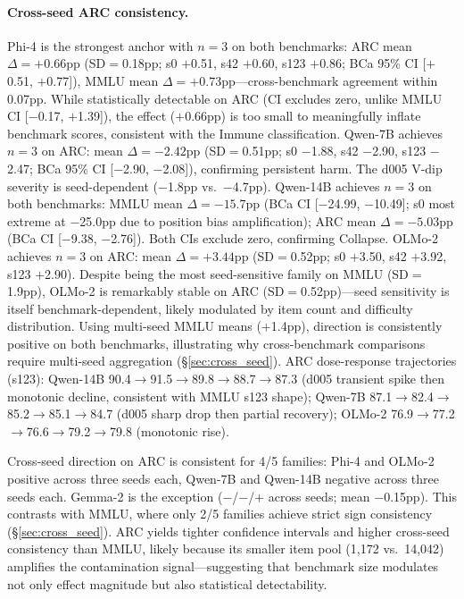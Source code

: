 \paragraph{Cross-seed ARC consistency.}
Phi-4 is the strongest anchor with $n\!=\!3$ on both benchmarks: ARC mean $\Delta = +0.66$pp (SD$=$0.18pp; s0 $+$0.51, s42 $+$0.60, s123 $+$0.86; BCa 95\% CI [$+$0.51, $+$0.77]), MMLU mean $\Delta = +0.73$pp---cross-benchmark agreement within 0.07pp. While statistically detectable on ARC (CI excludes zero, unlike MMLU CI [$-$0.17, $+$1.39]), the effect ($+$0.66pp) is too small to meaningfully inflate benchmark scores, consistent with the Immune classification. Qwen-7B achieves $n\!=\!3$ on ARC: mean $\Delta = -2.42$pp (SD$=$0.51pp; s0 $-$1.88, s42 $-$2.90, s123 $-$2.47; BCa 95\% CI [$-$2.90, $-$2.08]), confirming persistent harm. The d005 V-dip severity is seed-dependent ($-$1.8pp vs.\ $-$4.7pp). Qwen-14B achieves $n\!=\!3$ on both benchmarks: MMLU mean $\Delta = -15.7$pp (BCa CI [$-$24.99, $-$10.49]; s0 most extreme at $-$25.0pp due to position bias amplification); ARC mean $\Delta = -5.03$pp (BCa CI [$-$9.38, $-$2.76]). Both CIs exclude zero, confirming Collapse. OLMo-2 achieves $n\!=\!3$ on ARC: mean $\Delta = +3.44$pp (SD$=$0.52pp; s0 $+$3.50, s42 $+$3.92, s123 $+$2.90). Despite being the most seed-sensitive family on MMLU (SD$=$1.9pp), OLMo-2 is remarkably stable on ARC (SD$=$0.52pp)---seed sensitivity is itself benchmark-dependent, likely modulated by item count and difficulty distribution. Using multi-seed MMLU means ($+$1.4pp), direction is consistently positive on both benchmarks, illustrating why cross-benchmark comparisons require multi-seed aggregation (\S\ref{sec:cross_seed}). ARC dose-response trajectories (s123): Qwen-14B 90.4$\to$91.5$\to$89.8$\to$88.7$\to$87.3 (d005 transient spike then monotonic decline, consistent with MMLU s123 shape); Qwen-7B 87.1$\to$82.4$\to$85.2$\to$85.1$\to$84.7 (d005 sharp drop then partial recovery); OLMo-2 76.9$\to$77.2$\to$76.6$\to$79.2$\to$79.8 (monotonic rise).

Cross-seed direction on ARC is consistent for 4/5 families: Phi-4 and OLMo-2 positive across three seeds each, Qwen-7B and Qwen-14B negative across three seeds each. Gemma-2 is the exception ($-$/$-$/$+$ across seeds; mean $-$0.15pp). This contrasts with MMLU, where only 2/5 families achieve strict sign consistency (\S\ref{sec:cross_seed}). ARC yields tighter confidence intervals and higher cross-seed consistency than MMLU, likely because its smaller item pool (1{,}172 vs.\ 14{,}042) amplifies the contamination signal---suggesting that benchmark size modulates not only effect magnitude but also statistical detectability.

